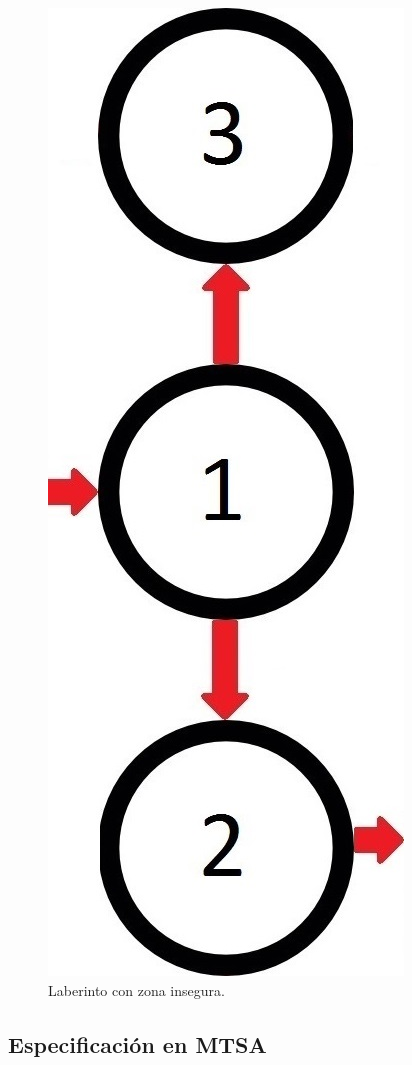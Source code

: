\begin{figure}[H]
	\centering
		\includegraphics[scale=0.2]{Imagenes/Laberintos/unsafe.jpg}
	\caption{Laberinto con zona insegura.}
	\label{fig:unsafe}
\end{figure}

\subsection{Especificación en MTSA}

